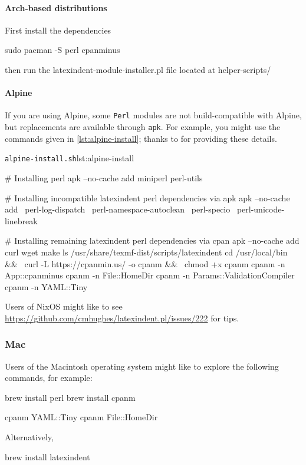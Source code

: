   \paragraph{Arch-based distributions}
   First install the dependencies
   \begin{commandshell}
sudo pacman -S perl cpanminus
\end{commandshell}
   then run the latexindent-module-installer.pl file located at helper-scripts/

  \paragraph{Alpine}
   If you are using Alpine, some \texttt{Perl} modules are not build-compatible with Alpine,
   but replacements are available through \texttt{apk}. For example, you might use the
   commands given in \cref{lst:alpine-install}; thanks to \cite{jun-sheaf} for providing
   these details.

   \begin{cmhlistings}[style=tcblatex,language=Bash]{\texttt{alpine-install.sh}}{lst:alpine-install}
		
# Installing perl
apk --no-cache add miniperl perl-utils

# Installing incompatible latexindent perl dependencies via apk
apk --no-cache add \
    perl-log-dispatch \
    perl-namespace-autoclean \
    perl-specio \
    perl-unicode-linebreak

# Installing remaining latexindent perl dependencies via cpan
apk --no-cache add curl wget make
ls /usr/share/texmf-dist/scripts/latexindent
cd /usr/local/bin && \
    curl -L https://cpanmin.us/ -o cpanm && \
    chmod +x cpanm
cpanm -n App::cpanminus
cpanm -n File::HomeDir
cpanm -n Params::ValidationCompiler
cpanm -n YAML::Tiny
\end{cmhlistings}

   Users of NixOS might like to see
   \href{https://github.com/cmhughes/latexindent.pl/issues/222}{https://github.com/cmhughes/latexindent.pl/issues/222}
   for tips.
 \subsubsection{Mac}
  Users of the Macintosh operating system might like to explore the following commands, for
  example:
  \begin{commandshell}
brew install perl
brew install cpanm

cpanm YAML::Tiny
cpanm File::HomeDir
\end{commandshell}
  Alternatively,
  \begin{commandshell}
brew install latexindent  
\end{commandshell}

